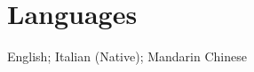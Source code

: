 \section{Languages}
  \resumeSubHeadingListStart
    \vspace{2mm}
    \item \footnotesize{English; Italian (Native); Mandarin Chinese}
  \resumeSubHeadingListEnd
